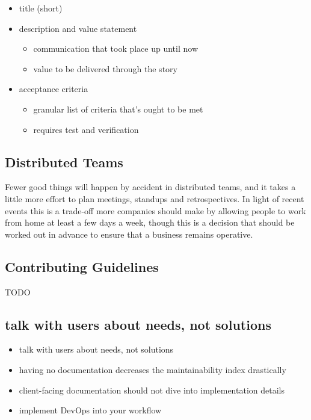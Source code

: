 \begin{itemize}
	\item title (short)
	\item description and value statement
	      \begin{itemize}
		      \item communication that took place up until now
		      \item value to be delivered through the story
	      \end{itemize}
	\item acceptance criteria
	      \begin{itemize}
		      \item granular list of criteria that's ought to be met
		      \item requires test and verification
	      \end{itemize}
\end{itemize}

\subsection{Distributed Teams}\label{agile-distributed-teams}

\begin{flushleft}
	Fewer good things will happen by accident in distributed teams, and it takes
	a little more effort to plan meetings, standups and retrospectives. In light
	of recent events this is a trade-off more companies should make by allowing
	people to work from home at least a few days a week, though this is a decision
	that should be worked out in advance to ensure that a business remains operative.
\end{flushleft}

\subsection{Contributing Guidelines}\label{agile-contributing-guidelines}

\begin{flushleft}
	TODO
\end{flushleft}

\subsection{talk with users about needs, not solutions}\label{agile-dos-and-donts}

\begin{itemize}
	\item talk with users about needs, not solutions
	\item having no documentation decreases the maintainability index drastically
	\item client-facing documentation should not dive into implementation details
	\item implement DevOps into your workflow
\end{itemize}

